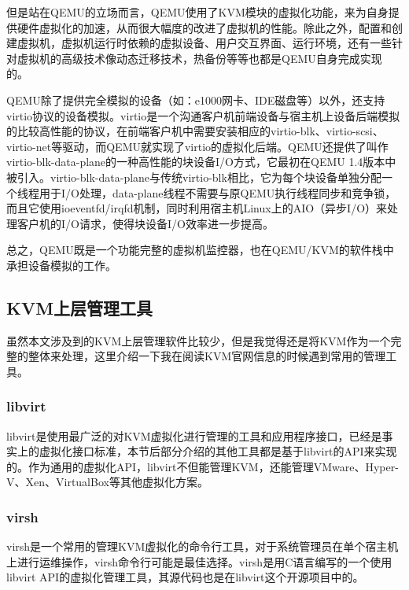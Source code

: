
但是站在QEMU的立场而言，QEMU使用了KVM模块的虚拟化功能，来为自身提供硬件虚拟化的加速，从而很大幅度的改进了虚拟机的性能。除此之外，配置和创建虚拟机，虚拟机运行时依赖的虚拟设备、用户交互界面、运行环境，还有一些针对虚拟机的高级技术像动态迁移技术，热备份等等也都是QEMU自身完成实现的。

QEMU除了提供完全模拟的设备（如：e1000网卡、IDE磁盘等）以外，还支持virtio协议的设备模拟。virtio是一个沟通客户机前端设备与宿主机上设备后端模拟的比较高性能的协议，在前端客户机中需要安装相应的virtio-blk、virtio-scsi、virtio-net等驱动，而QEMU就实现了virtio的虚拟化后端。QEMU还提供了叫作virtio-blk-data-plane的一种高性能的块设备I/O方式，它最初在QEMU 1.4版本中被引入。virtio-blk-data-plane与传统virtio-blk相比，它为每个块设备单独分配一个线程用于I/O处理，data-plane线程不需要与原QEMU执行线程同步和竞争锁，而且它使用ioeventfd/irqfd机制，同时利用宿主机Linux上的AIO（异步I/O）来处理客户机的I/O请求，使得块设备I/O效率进一步提高。

总之，QEMU既是一个功能完整的虚拟机监控器，也在QEMU/KVM的软件栈中承担设备模拟的工作。


\subsection{KVM上层管理工具}
虽然本文涉及到的KVM上层管理软件比较少，但是我觉得还是将KVM作为一个完整的整体来处理，这里介绍一下我在阅读KVM官网信息的时候遇到常用的管理工具。

\subsubsection{libvirt}
libvirt是使用最广泛的对KVM虚拟化进行管理的工具和应用程序接口，已经是事实上的虚拟化接口标准，本节后部分介绍的其他工具都是基于libvirt的API来实现的。作为通用的虚拟化API，libvirt不但能管理KVM，还能管理VMware、Hyper-V、Xen、VirtualBox等其他虚拟化方案。

\subsubsection{virsh}
virsh是一个常用的管理KVM虚拟化的命令行工具，对于系统管理员在单个宿主机上进行运维操作，virsh命令行可能是最佳选择。virsh是用C语言编写的一个使用libvirt API的虚拟化管理工具，其源代码也是在libvirt这个开源项目中的。


